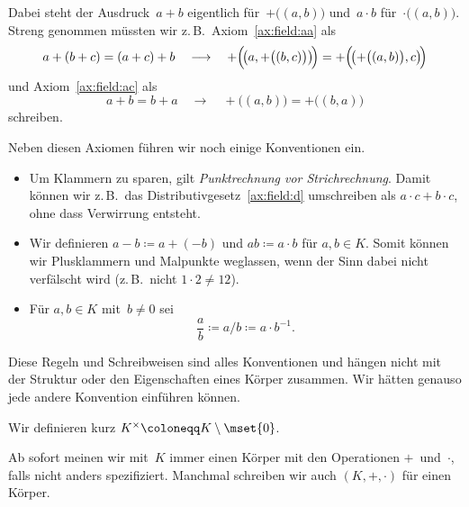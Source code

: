 \documentclass[a4paper]{article}
\begin{document}
\begin{remark}
    Dabei steht der Ausdruck~$a+b$ eigentlich für~$+\bigl((a, b)\bigr)$ und~$a\cdot b$ für~$\cdot\bigl((a, b)\bigr)$. Streng genommen müssten wir z.\,B.\ Axiom~\ref{ax:field:aa} als
    \begin{equation*}
        a+(b+c) = (a+c)+b \quad\longrightarrow\quad  +\Bigl(\!\bigl(a, +\bigl((b, c)\bigr)\bigr)\!\Bigr) = +\Bigl(\!\bigl(+\bigl((a, b)\bigr), c\bigr)\!\Bigr)
    \end{equation*}
    und Axiom~\ref{ax:field:ac} als
    \begin{equation*}
        a+b = b+a \quad\longrightarrow\quad +\bigl((a, b)\bigr) = +\bigl((b, a)\bigr)
    \end{equation*}
    schreiben.
\end{remark}

\begin{notation}\label{not:field:convention}
    Neben diesen Axiomen führen wir noch einige Konventionen ein.
    \begin{itemize}
        \item Um Klammern zu sparen, gilt \emph{Punktrechnung vor Strichrechnung}. Damit können wir z.\,B.\ das Distributivgesetz~\ref{ax:field:d} umschreiben als $a\cdot c + b\cdot c$, ohne dass Verwirrung entsteht.
        \item Wir definieren $a-b \coloneqq a+(-b)$ und $ab \coloneqq a\cdot b$ für $a, b \in K$. Somit können wir Plusklammern und Malpunkte weglassen, wenn der Sinn dabei nicht verfälscht wird (z.\,B.\ nicht $1 \cdot 2 \neq 12$).
        \item Für $a, b \in K$ mit~$b \neq 0$ sei
              \begin{equation*}
                  \frac{a}{b} \coloneqq a/b \coloneqq a \cdot b^{-1}.
              \end{equation*}
    \end{itemize}
\end{notation}

Diese Regeln und Schreibweisen sind alles Konventionen und hängen nicht mit der Struktur oder den Eigenschaften eines Körper zusammen. Wir hätten genauso jede andere Konvention einführen können.

\begin{notation}
    Wir definieren kurz $K^\times \coloneqq K \setminus \mset{0}$.
\end{notation}

Ab sofort meinen wir mit~$K$ immer einen Körper mit den Operationen $+$~und~$\cdot$, falls nicht anders spezifiziert. Manchmal schreiben wir auch $(K, +, \cdot)$ für einen Körper.
\end{document}
